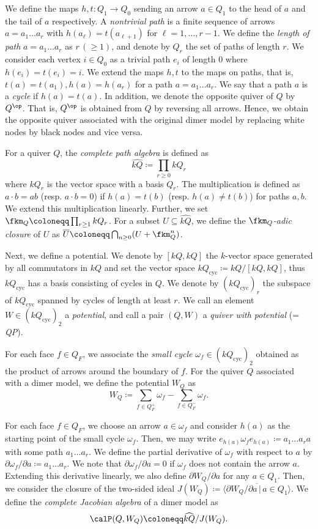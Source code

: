 We define the maps $h, t:Q_1\rightarrow Q_0$ sending an arrow $a\in Q_1$ to the head of $a$ and the tail of $a$ respectively. A \emph{nontrivial path} is a finite sequence of arrows $a=a_1\dots a_r$ with $h(a_\ell)=t(a_{\ell+1})$ for $\ell=1, \dots ,r-1$. We define the \emph{length of path} $a=a_1\dots a_r$ as $r \,(\ge 1)$, and denote by $Q_r$ the set of paths of length $r$. We consider each vertex $i\in Q_0$ as a trivial path $e_i$ of length $0$ where $h(e_i)=t(e_i)=i$. We extend the maps $h, t$ to the maps on paths, that is, $t(a)=t(a_1), h(a)=h(a_r)$ for a path $a=a_1\dots a_r$. We say that a path $a$ is a \emph{cycle} if $h(a)=t(a)$. In addition, we denote the opposite quiver of $Q$ by $Q^{\op}$. That is, $Q^{\op}$ is obtained from $Q$ by reversing all arrows. Hence, we obtain the opposite quiver associated with the original dimer model by replacing white nodes by black nodes and vice versa.

For a quiver $Q$, the \emph{complete path algebra} is defined as
\[
\widehat{kQ}\coloneqq\prod_{r\ge 0}kQ_r
\]
where $kQ_r$ is the vector space with a basis $Q_r$. The multiplication is defined as $a\cdot b=ab$ (resp. $a\cdot b=0$) if $h(a)=t(b)$ (resp. $h(a)\neq t(b)$) for paths $a, b$. We extend this multiplication linearly. Further, we set $\fkm_Q\coloneqq \prod_{r\ge 1}kQ_r$. For a subset $U\subseteq\widehat{kQ}$, we define the \emph{$\fkm_Q$-adic closure} of $U$ as $\overline{U}\coloneqq \bigcap_{n\ge 0}(U+\fkm_Q^n)$.

Next, we define a potential. We denote by $[kQ, kQ]$ the $k$-vector space generated by all commutators in $kQ$ and set the vector space $kQ_{\mathrm{cyc}}\coloneqq kQ/[kQ, kQ]$, thus $kQ_{\mathrm{cyc}}$ has a basis consisting of cycles in $Q$. We denote by $(kQ_{\mathrm{cyc}})_r$ the subspace of $kQ_{\mathrm{cyc}}$ spanned by cycles of length at least $r$. We call an element $W\in (kQ_{\mathrm{cyc}})_2$ a \emph{potential}, and call a pair $(Q,W)$ a \emph{quiver with potential} (= \emph{QP}).

For each face $f\in Q_F$, we associate the \emph{small cycle} $\omega_f\in (kQ_{\mathrm{cyc}})_2$ obtained as the product of arrows around the boundary of $f$. For the quiver $Q$ associated with a dimer model, we define the potential $W_Q$ as
\[
W_Q\coloneqq \sum_{f\in Q^+_F}\omega_f-\sum_{f\in Q^-_F}\omega_f.
\]

For each face $f\in Q_F$, we choose an arrow $a\in \omega_f$ and consider $h(a)$ as the starting point of the small cycle $\omega_f$. Then, we may write $e_{h(a)}\omega_fe_{h(a)}\coloneqq a_1\dots a_ra$ with some path $a_1\dots a_r$. We define the partial derivative of $\omega_f$ with respect to $a$ by $\partial \omega_f/\partial a\coloneqq a_1\dots a_r$. We note that $\partial \omega_f/\partial a=0$ if $\omega_f$ does not contain the arrow $a$. Extending this derivative linearly, we also define $\partial W_Q/\partial a$ for any $a\in Q_1$. Then, we consider the closure of the two-sided ideal $J(W_Q)\coloneqq \langle\overline{\partial W_Q/\partial a\,|\,a\in Q_1}\rangle$. We define the \emph{complete Jacobian algebra} of a dimer model as
\[
\calP(Q, W_Q)\coloneqq \widehat{kQ}/J(W_Q).
\]

